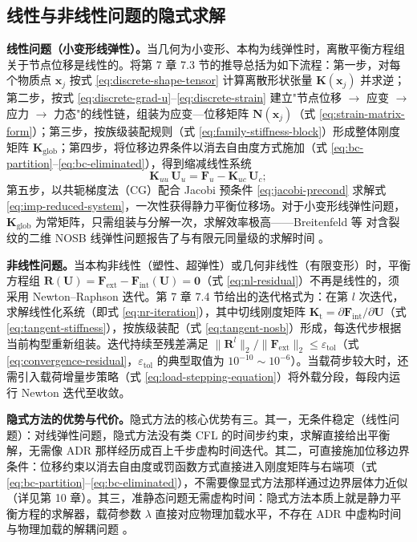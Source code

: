 \subsection{线性与非线性问题的隐式求解}\label{sec:imp-overview}

\textbf{线性问题（小变形线弹性）。}当几何为小变形、本构为线弹性时，离散平衡方程组关于节点位移是线性的。将第 7 章 7.3 节的推导总括为如下流程：第一步，对每个物质点 $\mathbf{x}_j$ 按式 \eqref{eq:discrete-shape-tensor} 计算离散形状张量 $\mathbf{K}(\mathbf{x}_j)$ 并求逆；第二步，按式 \eqref{eq:discrete-grad-u}--\eqref{eq:discrete-strain} 建立"节点位移 $\to$ 应变 $\to$ 应力 $\to$ 力态"的线性链，组装为应变—位移矩阵 $\mathbf{N}(\mathbf{x}_j)$（式 \eqref{eq:strain-matrix-form}）；第三步，按族级装配规则（式 \eqref{eq:family-stiffness-block}）形成整体刚度矩阵 $\mathbf{K}_{\mathrm{glob}}$；第四步，将位移边界条件以消去自由度方式施加（式 \eqref{eq:bc-partition}--\eqref{eq:bc-eliminated}），得到缩减线性系统
\begin{equation}
  \mathbf{K}_{uu}\,\mathbf{U}_{u}
  =\mathbf{F}_{u}-\mathbf{K}_{uc}\,\mathbf{U}_{c};
  \label{eq:imp-reduced-system}
\end{equation}
第五步，以共轭梯度法（CG）配合 Jacobi 预条件 \eqref{eq:jacobi-precond} 求解式 \eqref{eq:imp-reduced-system}，一次性获得静力平衡位移场。对于小变形线弹性问题，$\mathbf{K}_{\mathrm{glob}}$ 为常矩阵，只需组装与分解一次，求解效率极高——Breitenfeld 等 \cite{Breitenfeld2014} 对含裂纹的二维 NOSB 线弹性问题报告了与有限元同量级的求解时间 \cite{Breitenfeld2014,BreitenfeldThesis2014}。

\textbf{非线性问题。}当本构非线性（塑性、超弹性）或几何非线性（有限变形）时，平衡方程组 $\mathbf{R}(\mathbf{U})=\mathbf{F}_{\text{ext}}-\mathbf{F}_{\text{int}}(\mathbf{U})=\mathbf{0}$（式 \eqref{eq:nl-residual}）不再是线性的，须采用 Newton--Raphson 迭代。第 7 章 7.4 节给出的迭代格式为：在第 $l$ 次迭代，求解线性化系统（即式 \eqref{eq:nr-iteration}），其中切线刚度矩阵 $\mathbf{K}_{\mathrm{t}}=\partial\mathbf{F}_{\mathrm{int}}/\partial\mathbf{U}$（式 \eqref{eq:tangent-stiffness}），按族级装配（式 \eqref{eq:tangent-nosb}）形成，每迭代步根据当前构型重新组装。迭代持续至残差满足 $\lVert\mathbf{R}^{l}\rVert_{2}/\lVert\mathbf{F}_{\text{ext}}\rVert_{2}\le\varepsilon_{\text{tol}}$（式 \eqref{eq:convergence-residual}，$\varepsilon_{\text{tol}}$ 的典型取值为 $10^{-10}\sim10^{-6}$）。当载荷步较大时，还需引入载荷增量步策略（式 \eqref{eq:load-stepping-equation}）将外载分段，每段内运行 Newton 迭代至收敛。

\textbf{隐式方法的优势与代价。}隐式方法的核心优势有三。其一，无条件稳定（线性问题）：对线弹性问题，隐式方法没有类 CFL 的时间步约束，求解直接给出平衡解，无需像 ADR 那样经历成百上千步虚构时间迭代。其二，可直接施加位移边界条件：位移约束以消去自由度或罚函数方式直接进入刚度矩阵与右端项（式 \eqref{eq:bc-partition}--\eqref{eq:bc-eliminated}），不需要像显式方法那样通过边界层体力近似（详见第 10 章）。其三，准静态问题无需虚构时间：隐式方法本质上就是静力平衡方程的求解器，载荷参数 $\lambda$ 直接对应物理加载水平，不存在 ADR 中虚构时间与物理加载的解耦问题 \cite{Breitenfeld2014,Littlewood2015}。

